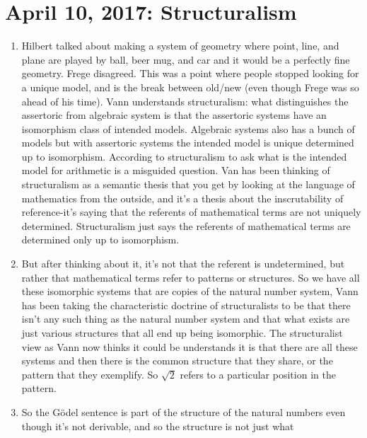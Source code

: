\documentclass[12pt]{article}
\theoremstyle{definition}
\begin{document}
\section{April 10, 2017: Structuralism}

\begin{enumerate}
    \itemsep0em 
    \item
        Hilbert talked about making a system of geometry where point, line, and
        plane are played by ball, beer mug, and car and it would be a perfectly
        fine geometry. Frege disagreed. This was a point where people stopped
        looking for a unique model, and is the break between old/new (even
        though Frege was so ahead of his time). Vann understands structuralism:
        what distinguishes the assertoric from algebraic system is that the
        assertoric systems have an isomorphism class of intended models.
        Algebraic systems also has a bunch of models but with assertoric systems
        the intended model is unique determined up to isomorphism. According to
        structuralism to ask what is the intended model for arithmetic is a
        misguided question. Van has been thinking of structuralism as a
        semantic thesis that you get by looking at the language of mathematics
        from the outside, and it's a thesis about the inscrutability of
        reference-it's saying that the referents of mathematical terms are not
        uniquely determined. Structuralism just says the referents of
        mathematical terms are determined only up to isomorphism.
    \item
        But after thinking about it, it's not that the referent is
        undetermined, but rather that mathematical terms refer to patterns or
        structures. So we have all these isomorphic systems that are copies of
        the natural number system, Vann has been taking the characteristic
        doctrine of structuralists to be that there isn't any such thing as the
        natural number system and that what exists are just various structures
        that all end up being isomorphic. The structuralist view as Vann now
        thinks it could be understands it is that there are all these systems
        and then there is the common structure that they share, or the pattern
        that they exemplify. So $\sqrt{2}$ refers to a particular position in
        the pattern.
    \item
        So the G\"odel sentence is part of the structure of the natural numbers
        even though it's not derivable, and so the structure is not just what

\end{enumerate}
\end{document}
